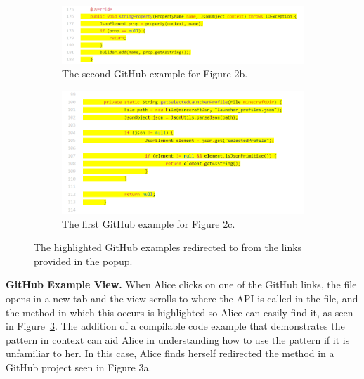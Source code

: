 \begin{figure}
\centering
  \begin{subfigure}[a]{0.48\textwidth}
  \includegraphics[width=\textwidth]{json_null_gh2.PNG}
  \caption{The second GitHub example for Figure 2b.} 
  \vspace{.1in}
  \label{fig:github1}
  \end{subfigure}
  \hfill
  \begin{subfigure}[b]{0.48\textwidth}
  \includegraphics[width=\textwidth]{json_primitive_gh1.PNG}
  \caption{The first GitHub example for Figure 2c.}
  \vspace{.1in}
  \label{fig:github2}
  \end{subfigure}
  \hfill
\caption{The highlighted GitHub examples redirected to from the links provided in the popup.}
\label{fig:github_examples}
\end{figure}

{\bf GitHub Example View.} When Alice clicks on one of the GitHub links, the file opens in a new tab and the view scrolls to where the API is called in the file, and the method in which this occurs is highlighted so Alice can easily find it, as seen in Figure~\ref{fig:github_examples}. The addition of a compilable code example that demonstrates the pattern in context can aid Alice in understanding how to use the pattern if it is unfamiliar to her. In this case, Alice finds herself redirected the method in a GitHub project seen in Figure 3a.

